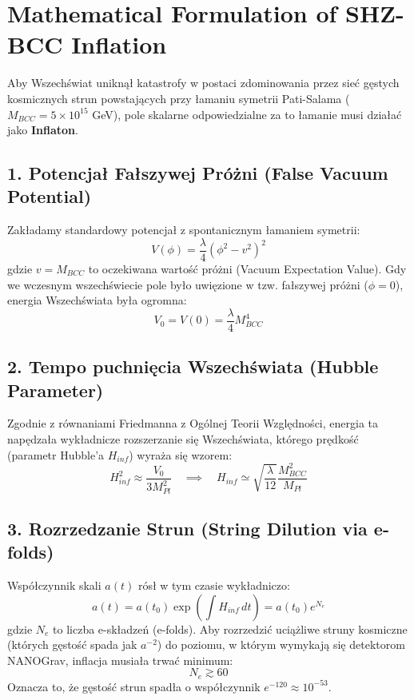 \documentclass[11pt,a4paper]{article}
\begin{document}
\section*{Mathematical Formulation of SHZ-BCC Inflation}

Aby Wszechświat uniknął katastrofy w postaci zdominowania przez sieć gęstych kosmicznych strun powstających przy łamaniu symetrii Pati-Salama ($M_{BCC} = 5 \times 10^{15}$ GeV), pole skalarne odpowiedzialne za to łamanie musi działać jako \textbf{Inflaton}.

\subsection*{1. Potencjał Fałszywej Próżni (False Vacuum Potential)}
Zakładamy standardowy potencjał z spontanicznym łamaniem symetrii:
\begin{equation}
    V(\phi) = \frac{\lambda}{4} \left( \phi^2 - v^2 \right)^2
\end{equation}
gdzie $v = M_{BCC}$ to oczekiwana wartość próżni (Vacuum Expectation Value). Gdy we wczesnym wszechświecie pole było uwięzione w tzw. fałszywej próżni ($\phi = 0$), energia Wszechświata była ogromna:
\begin{equation}
    V_0 = V(0) = \frac{\lambda}{4} M_{BCC}^4
\end{equation}

\subsection*{2. Tempo puchnięcia Wszechświata (Hubble Parameter)}
Zgodnie z równaniami Friedmanna z Ogólnej Teorii Względności, energia ta napędzała wykładnicze rozszerzanie się Wszechświata, którego prędkość (parametr Hubble'a $H_{inf}$) wyraża się wzorem:
\begin{equation}
    H_{inf}^2 \approx \frac{V_0}{3 M_{Pl}^2} \quad \implies \quad H_{inf} \simeq \sqrt{\frac{\lambda}{12}} \frac{M_{BCC}^2}{M_{Pl}}
\end{equation}

\subsection*{3. Rozrzedzanie Strun (String Dilution via e-folds)}
Współczynnik skali $a(t)$ rósł w tym czasie wykładniczo:
\begin{equation}
    a(t) = a(t_0) \exp\left( \int H_{inf} \, dt \right) = a(t_0) e^{N_e}
\end{equation}
gdzie $N_e$ to liczba e-składzeń (e-folds). Aby rozrzedzić uciążliwe struny kosmiczne (których gęstość spada jak $a^{-2}$) do poziomu, w którym wymykają się detektorom NANOGrav, inflacja musiała trwać minimum:
\begin{equation}
    N_e \gtrsim 60
\end{equation}
Oznacza to, że gęstość strun spadła o współczynnik $e^{-120} \approx 10^{-53}$.
\end{document}
